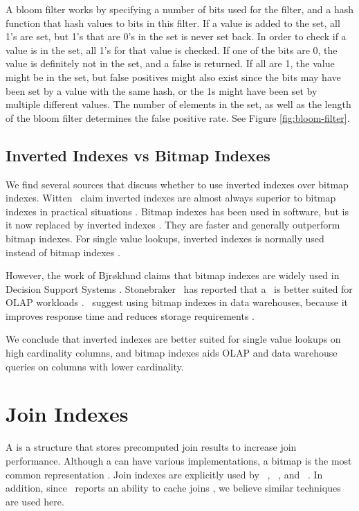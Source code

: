A bloom filter works by specifying a number of bits used for the filter, and a hash function that hash values to bits in this filter. If a value is added to the set, all 1's are set, but 1's that are 0's in the set is never set back. In order to check if a value is in the set, all 1's for that value is checked. If one of the bits are 0, the value is definitely not in the set, and a false is returned. If all are 1, the value might be in the set, but false positives might also exist since the bits may have been set by a value with the same hash, or the 1s might have been set by multiple different values. The number of elements in the set, as well as the length of the bloom filter determines the false positive rate. See Figure \ref{fig:bloom-filter}.

\subsection{Inverted Indexes vs Bitmap Indexes}
\label{sub:Inverted Indexes vs Bitmap Indexes}
We find several sources that discuss whether to use inverted indexes over bitmap indexes. Witten \ea~claim inverted indexes are almost always superior to bitmap indexes in practical situations \cite{Witten1999-qq}. Bitmap indexes has been used in  software, but is it now replaced by inverted indexes \cite{Bjorklund2011-wh}. They are faster and generally outperform bitmap indexes. For single value lookups, inverted indexes is normally used instead of bitmap indexes \cite{Moffat1992-tz}.

However, the work of Bjrøklund claims that bitmap indexes are widely used in Decision Support Systems \cite{Bjorklund2011-wh}. Stonebraker \ea~has reported that a \biti~is better suited for OLAP workloads \cite{Stonebraker2005-qz}. \oracle~suggest using bitmap indexes in data warehouses, because it improves response time and reduces storage requirements \cite{noauthor_undated-hp}.

We conclude that inverted indexes are better suited for single value lookups on high cardinality columns, and bitmap indexes aids OLAP and data warehouse queries on columns with lower cardinality.

\section{Join Indexes}
\label{sec:Join Indexes}
A  is a structure that stores precomputed join results to increase join performance. Although a  can have various implementations, a bitmap is the most common representation \cite{Bjorklund2011-wh}. Join indexes are explicitly used by \monetdb~\cite{Boncz2002-yj}, \monetx~\cite{Boncz2005-wj}, and \oracle~\cite{noauthor_undated-hp}. In addition, since \exasol~reports an ability to cache joins \cite{Exasol2014-xh}, we believe similar techniques are used here.

